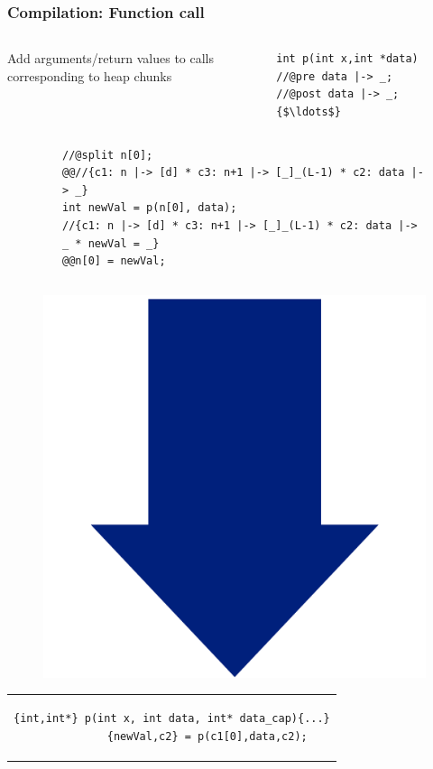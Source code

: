 \documentclass{beamer}
\begin{document}
\begin{frame}[fragile]
\frametitle{Compilation: Function call}
\begin{columns}
\begin{column}{0.55\textwidth}
Add arguments/return values to calls\\
\quad corresponding to heap chunks
\end{column}
\begin{column}{0.42\textwidth}
\begin{lstlisting}[style=CStyle, captionpos = t]
int p(int x,int *data)
//@pre data |-> _; 
//@post data |-> _;
{$\ldots$}
\end{lstlisting}
\end{column}
\end{columns}
\vspace{-1em}

\begin{columns}
\begin{column}{0.15\textwidth}
\end{column}
\begin{column}{0.90\textwidth}
\begin{figure}[h]
  \centering
\begin{lstlisting}[style=CStyleOverlay, captionpos = t, firstnumber = 11]
//@split n[0];
@@//{c1: n |-> [d] * c3: n+1 |-> [_]_(L-1) * c2: data |-> _}
int newVal = p(n[0], data);
//{c1: n |-> [d] * c3: n+1 |-> [_]_(L-1) * c2: data |-> _ * newVal = _}
@@n[0] = newVal;
\end{lstlisting}
\end{figure}
\end{column}
\end{columns}

\vspace{-.5em}
\begin{figure}[h]
\includegraphics[width=0.07\linewidth]{BlueArrowVertical}
\end{figure}
\vspace{-2em}

\begin{center}
\begin{tabular}{c}
\begin{lstlisting}[style=CStyleNoNum, captionpos = t]
{int,int*} p(int x, int data, int* data_cap){...}
           {newVal,c2} = p(c1[0],data,c2);
\end{lstlisting}
\end{tabular}
\end{center}

\end{frame}
\end{document}
